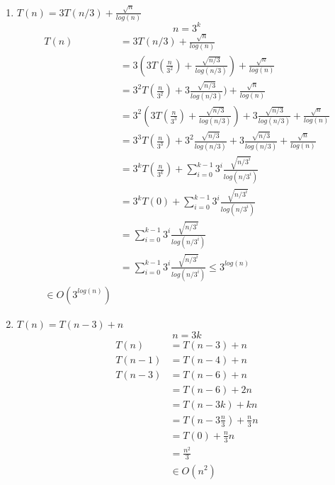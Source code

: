 \documentclass{article}
\begin{document}
\begin{enumerate}
\begin{enumerate}
        \item $T(n) = 3T(n/3) + \frac{\sqrt{n}}{log(n)}$
        \begin{equation*}
            n = 3^k
        \end{equation*}
        \begin{align*}
            T(n) &= 3T(n/3) + \frac{\sqrt{n}}{log(n)}\\
            &= 3(3T(\frac{n}{3^2}) + \frac{\sqrt{n/3}}{log(n/3)}) + \frac{\sqrt{n}}{log(n)}\\
            &= 3^2T(\frac{n}{3^2}) + 3\frac{\sqrt{n/3}}{log(n/3)}) + \frac{\sqrt{n}}{log(n)}\\
            &= 3^2(3T(\frac{n}{3^3}) + \frac{\sqrt{n/3}}{log(n/3)}) + 3\frac{\sqrt{n/3}}{log(n/3)} + \frac{\sqrt{n}}{log(n)}\\
            &= 3^3T(\frac{n}{3^3}) + 3^2\frac{\sqrt{n/3}}{log(n/3)} + 3\frac{\sqrt{n/3}}{log(n/3)} + \frac{\sqrt{n}}{log(n)}\\
            &= 3^kT(\frac{n}{3^k}) + \sum_{i =0}^{k-1}3^i\frac{\sqrt{n/3^i}}{log(n/3^i)} \\
            &= 3^kT(0) + \sum_{i =0}^{k-1}3^i\frac{\sqrt{n/3^i}}{log(n/3^i)}\\
            &= \sum_{i =0}^{k-1}3^i\frac{\sqrt{n/3^i}}{log(n/3^i)}\\
            &= \sum_{i =0}^{k-1}3^i\frac{\sqrt{n/3^i}}{log(n/3^i)} \leq 3^{log(n)}\\
            \in O(3^{log(n)})
        \end{align*}
        \item $T(n) = T(n - 3) +n$
        \begin{equation*}
            n = 3k
        \end{equation*}
        \begin{align*}
            T(n) &= T(n -3) + n\\
            T(n-1) &= T(n-4) + n\\
            T(n-3) &= T(n-6) + n\\
            &= T(n-6) + 2n\\
            &= T(n-3k) + kn\\
            &= T(n-3\frac{n}{3}) + \frac{n}{3}n\\
            &= T(0) + \frac{n}{3}n\\
            &= \frac{n^2}{3}\\
            &\in O(n^2)
        \end{align*}
    \end{enumerate}

\end{enumerate}
\end{document}
